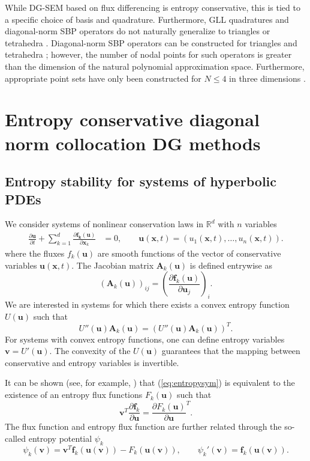 \documentclass[preprint,10pt]{article}
\theoremstyle{definition}
\theoremstyle{lemma}
\theoremstyle{theorem}
\newcommand{\pd}[2]{\frac{\partial#1}{\partial#2}}
\newcommand{\LRp}[1]{\left( #1 \right)}
\newcommand{\note}[1]{{\color{blue}{#1}}}
\begin{document}
While DG-SEM based on flux differencing is entropy conservative, this is tied to a specific choice of basis and quadrature.  Furthermore, GLL quadratures and diagonal-norm SBP operators do not naturally generalize to triangles or tetrahedra \cite{helenbrook2009existence}.  Diagonal-norm SBP operators can be constructed for triangles and tetrahedra \cite{chin1999higher, cohen2001higher, hicken2016multidimensional, chen2017entropy}; however, the number of nodal points for such operators is greater than the dimension of the natural polynomial approximation space.  Furthermore, appropriate point sets have only been constructed for $N \leq 4$ in three dimensions \cite{zhebel2014comparison}.  

\section{Entropy conservative diagonal norm collocation DG methods}

\note{Specify what we mean by diagonal norm collocation DG method.}

\subsection{Entropy stability for systems of hyperbolic PDEs}

We consider systems of nonlinear conservation laws in $\mathbb{R}^d$ with $n$ variables
\begin{align}
\pd{\bm{u}}{t} + \sum_{k=1}^d \pd{\bm{f_k(\bm{u})}}{\bm{x}_k} &= 0, \qquad \bm{u}(\bm{x},t) = (u_1(\bm{x},t),\ldots,u_n(\bm{x},t)).
\label{eq:pde}
\end{align}
where the fluxes $f_k(\bm{u})$ are smooth functions of the vector of conservative variables $\bm{u}(\bm{x},t)$.
The Jacobian matrix $\bm{A}_k(\bm{u})$ is defined entrywise as
\[
\LRp{\bm{A}_k(\bm{u})}_{ij} = \LRp{\pd{\bm{f}_k(\bm{u})}{\bm{u}_j}}_i.
\]
We are interested in systems for which there exists a convex entropy function $U(\bm{u})$ such that  
\begin{equation}
U''(\bm{u})\bm{A}_k(\bm{u}) = \LRp{U''(\bm{u}) \bm{A}_k(\bm{u})}^T.
\label{eq:entropysym}
\end{equation}
For systems with convex entropy functions, one can define entropy variables $\bm{v} = U'(\bm{u})$.  The convexity of the $U(\bm{u})$ guarantees that the mapping between conservative and entropy variables is invertible.  

It can be shown (see, for example, \cite{mock1980systems}) that (\ref{eq:entropysym}) is equivalent to the existence of an entropy flux functions $F_k(\bm{u})$ such that
\[
\bm{v}^T \pd{\bm{f}_k}{\bm{u}} = \pd{F_k(\bm{u})}{\bm{u}}^T.
\]
The flux function and entropy flux function are further related through the so-called entropy potential $\psi_k$ 
\[
\psi_k(\bm{v}) = \bm{v}^T\bm{f}_k(\bm{u}(\bm{v})) - F_k(\bm{u}(\bm{v})), \qquad \psi_k'(\bm{v}) = \bm{f}_k(\bm{u}(\bm{v})).
\]
\end{document}
